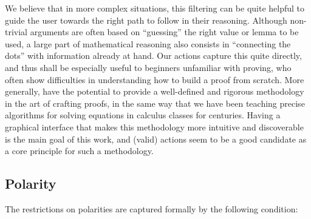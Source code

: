 We believe that in more complex situations, this filtering can be quite helpful
to guide the user towards the right path to follow in their reasoning. Although
non-trivial arguments are often based on ``guessing'' the right value or lemma
to be used, a large part of mathematical reasoning also consists in ``connecting
the dots'' with information already at hand. Our  actions capture this
 quite directly, and thus shall be especially useful to beginners
unfamiliar with proving, who often show difficulties in understanding how to
build a proof from scratch. More generally,  have the potential
to provide a well-defined and rigorous methodology in the art of crafting
proofs, in the same way that we have been teaching precise algorithms for
solving equations in calculus classes for centuries. Having a graphical
interface that makes this methodology more intuitive and discoverable is the
main goal of this work, and (valid)  actions seem to be a good candidate as a
core principle for such a methodology.

\subsection{Polarity}

The restrictions on polarities are captured formally by the following condition:


